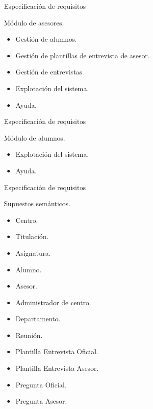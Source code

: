 \documentclass[10pt, hyperref={pdfpagelabels=false}]{beamer}
\begin{document}
      \begin{frame}{Especificación de requisitos}
        \begin{block}{Módulo de asesores.}
          \begin{itemize}
           \item Gestión de alumnos.
           \item Gestión de plantillas de entrevista de asesor.
           \item Gestión de entrevistas.
           \item Explotación del sistema.
           \item Ayuda.
          \end{itemize}
        \end{block}
      \end{frame}

      \begin{frame}{Especificación de requisitos}
        \begin{block}{Módulo de alumnos.}
          \begin{itemize}
           \item Explotación del sistema.
           \item Ayuda.
          \end{itemize}
        \end{block}
      \end{frame}

      \begin{frame}{Especificación de requisitos}
        \begin{block}{Supuestos semánticos.}
          \begin{multicols}{2}
          \begin{itemize}
           \item Centro.
           \item Titulación.
           \item Asignatura.
           \item Alumno.
           \item Asesor.
           \item Administrador de centro.
           \item Departamento.
           \item Reunión.
           \item Plantilla Entrevista Oficial.
           \item Plantilla Entrevista Asesor.
           \item Pregunta Oficial.
           \item Pregunta Asesor.
          \end{itemize}
          \end{multicols}
        \end{block}
      \end{frame}
\end{document}
